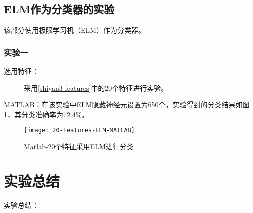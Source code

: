 \subsection{ELM作为分类器的实验}
该部分使用极限学习机（ELM）作为分类器。

\subsubsection{实验一}
\begin{description}
\item[选用特征：] 采用\ref{shiyan3-features}中的20个特征进行实验。
\end{description}
MATLAB：在该实验中ELM隐藏神经元设置为650个，实验得到的分类结果如图\ref{fig:20-Features-ELM-MATLAB}，其分类准确率为72.4\%。
\begin{figure}[!ht]
\centering
\texttt{[image: 20-Features-ELM-MATLAB]}
\caption{Matlab-20个特征采用ELM进行分类}
\label{fig:20-Features-ELM-MATLAB}
\end{figure}


\section{实验总结}
实验总结：

\begin{comment}
2015.9.15
\begin{itemize}
\item MATLAB进行实验的结果要比C的好，因此实验以MATLAB为主。
\item 在进行实验过程中，PKID中的特征只使用了13个（原来计划选用22个）。原因是由于图像质量原因，特征提取效果不是特别好，以至于一些特征对分类准确率的提升没有太大贡献。另外，还有两个特征我没有找到计算方法，但我感觉对实验结果提高不会有太大影响。
\item 实验中提取的特征不如PkID系统中的特征好（有一部分原因是实验中特征提取是对图像提取的，而图像质量又较低，导致提取的特征不准确。PkID系统中的基本特征都是从ZooProcess中得到的，能更好的反映浮游动物的特征），其分类的准确率也比PkID系统中的特征低2到3个百分点。
\item 因为需要使用的特征既有特征值，也有特征向量，这些特征直接一起使用会降低准确率，因此需要进行了特征融合（实验四、五）。目前采用了20个特征与LBP特征融合，分类的准确率有了一定的提高（达到76.1\%）。
\end{itemize}

接下来的工作：在特征融合的基础上继续进行实验，实验将不同形式的特征结合来得到更高的分类准确率。
\end{comment}